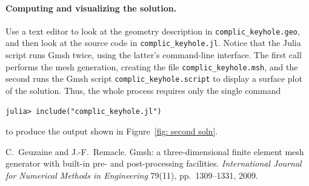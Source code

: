 \documentclass[a4paper,12pt]{article}
\begin{document}
\paragraph{Computing and visualizing the solution.}  
Use a text editor to look at the geometry description 
in \verb!complic_keyhole.geo!, and then look at the source code in
\verb!complic_keyhole.jl!.  Notice that the Julia script runs Gmsh 
twice, using the latter's command-line interface.  The first call 
performs the mesh generation, creating the file 
\verb!complic_keyhole.msh!, and the second runs the Gmsh 
script \verb!complic_keyhole.script! to display a surface plot of the 
solution.  Thus, the whole process requires only the single command
\begin{verbatim}
julia> include("complic_keyhole.jl")
\end{verbatim}
to produce the output shown in Figure~\ref{fig: second soln}.
\begin{thebibliography}{0}
C.~Geuzaine and J.-F.~Remacle. Gmsh: a three-dimensional finite 
element mesh generator with built-in pre- and post-processing 
facilities. \emph{International Journal for Numerical Methods in 
Engineering} 79(11), pp.~1309--1331, 2009.
\end{thebibliography}
\end{document}
